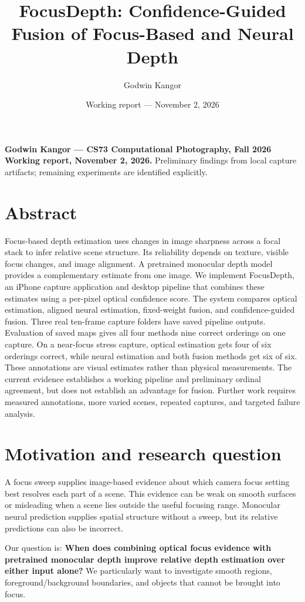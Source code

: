 \documentclass[11pt]{article}
\title{FocusDepth: Confidence-Guided Fusion of Focus-Based and Neural Depth}
\author{Godwin Kangor}
\date{Working report --- November 2, 2026}
\begin{document}
\maketitle

\textbf{Godwin Kangor — CS73 Computational Photography, Fall 2026}  
\textbf{Working report, November 2, 2026.} Preliminary findings from local capture artifacts; remaining experiments are identified explicitly.

\section*{Abstract}

Focus-based depth estimation uses changes in image sharpness across a focal stack to infer relative scene structure. Its reliability depends on texture, visible focus changes, and image alignment. A pretrained monocular depth model provides a complementary estimate from one image. We implement FocusDepth, an iPhone capture application and desktop pipeline that combines these estimates using a per-pixel optical confidence score. The system compares optical estimation, aligned neural estimation, fixed-weight fusion, and confidence-guided fusion. Three real ten-frame capture folders have saved pipeline outputs. Evaluation of saved maps gives all four methods nine correct orderings on one capture. On a near-focus stress capture, optical estimation gets four of six orderings correct, while neural estimation and both fusion methods get six of six. These annotations are visual estimates rather than physical measurements. The current evidence establishes a working pipeline and preliminary ordinal agreement, but does not establish an advantage for fusion. Further work requires measured annotations, more varied scenes, repeated captures, and targeted failure analysis.

\section{Motivation and research question}

A focus sweep supplies image-based evidence about which camera focus setting best resolves each part of a scene. This evidence can be weak on smooth surfaces or misleading when a scene lies outside the useful focusing range. Monocular neural prediction supplies spatial structure without a sweep, but its relative predictions can also be incorrect.

Our question is: \textbf{When does combining optical focus evidence with pretrained monocular depth improve relative depth estimation over either input alone?} We particularly want to investigate smooth regions, foreground/background boundaries, and objects that cannot be brought into focus.
\end{document}
